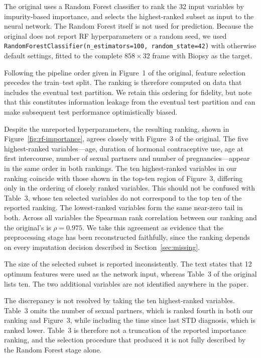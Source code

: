 The original uses a Random Forest classifier to rank the 32 input variables by
impurity-based importance, and selects the highest-ranked subset as input to
the neural network. The Random Forest itself is not used for prediction.
Because the original does not report RF hyperparameters or a random seed, we
used \texttt{RandomForestClassifier(n\_estimators=100, random\_state=42)} with
otherwise default settings, fitted to the complete $858 \times 32$ frame with
Biopsy as the target.

Following the pipeline order given in Figure~1 of the original, feature
selection precedes the train--test split. The ranking is therefore computed on
data that includes the eventual test partition. We retain this ordering for
fidelity, but note that this constitutes information leakage from the eventual
test partition and can make subsequent test performance optimistically biased.

Despite the unreported hyperparameters, the resulting ranking, shown in
Figure~\ref{fig:rf-importance}, agrees closely with Figure~3 of the original.
The five highest-ranked variables---age, duration of hormonal contraceptive
use, age at first intercourse, number of sexual partners and number of
pregnancies---appear in the same order in both rankings. The ten highest-ranked
variables in our ranking coincide with those shown in the top-ten region of
Figure~3, differing only in the ordering of closely ranked variables. This
should not be confused with Table~3, whose ten selected variables do not
correspond to the top ten of the reported ranking. The lowest-ranked variables
form the same near-zero tail in both. Across all variables the Spearman rank
correlation between our ranking and the original's is $\rho = 0.975$. We take
this agreement as evidence that the preprocessing stage has been reconstructed
faithfully, since the ranking depends on every imputation decision described in
Section~\ref{sec:missing}.

The size of the selected subset is reported inconsistently. The text states
that 12 optimum features were used as the network input, whereas Table~3 of the
original lists ten. The two additional variables are not identified anywhere in
the paper.

The discrepancy is not resolved by taking the ten highest-ranked variables.
Table~3 omits the number of sexual partners, which is ranked fourth in both our
ranking and Figure~3, while including the time since last STD diagnosis, which
is ranked lower. Table~3 is therefore not a truncation of the reported
importance ranking, and the selection procedure that produced it is not fully
described by the Random Forest stage alone.

